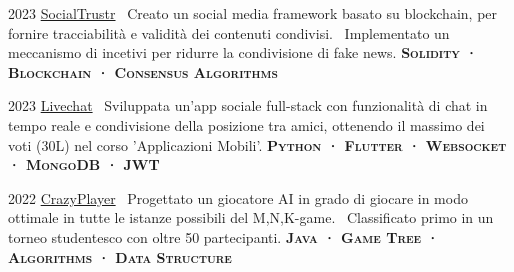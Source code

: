 \documentclass{tccv}
\begin{document}
\begin{yearlist}

\item{2023}
     {\href{https://github.com/manuelarto/socialtrustr}{SocialTrustr}}
     {\textbullet~Creato un social media framework basato su blockchain, per fornire tracciabilità e validità dei contenuti condivisi. \newline
     \textbullet~Implementato un meccanismo di incetivi per ridurre la condivisione di fake news. \newline
     \textbf{\textsc{Solidity · Blockchain · Consensus Algorithms}}}
\item{2023}
     {\href{https://github.com/manuelarto/livechat}{Livechat}}
     {\textbullet~Sviluppata un'app sociale full-stack con funzionalità di chat in tempo reale e condivisione della posizione tra amici, ottenendo il massimo dei voti (30L) nel corso 'Applicazioni Mobili'. \newline
     \textbf{\textsc{Python · Flutter · Websocket · MongoDB · JWT}}}
\item{2022}
     {\href{https://github.com/manuelarto/crazyplayer}{CrazyPlayer}}
     {\textbullet~Progettato un giocatore AI in grado di giocare in modo ottimale in tutte le istanze possibili del M,N,K-game. \newline
     \textbullet~Classificato primo in un torneo studentesco con oltre 50 partecipanti. \newline
     \textbf{\textsc{Java · Game Tree · Algorithms · Data Structure}}}

\end{yearlist}






\end{document}
